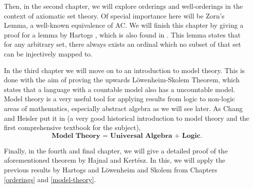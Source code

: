 \documentclass[../../main.tex]{subfiles}
\begin{document}
Then, in the second chapter, we will explore orderings and well-orderings in the context of axiomatic set theory.
Of special importance here will be Zorn's Lemma, a well-known equivalence of AC.
We will finish this chapter by giving a proof for a lemma by Hartogs \cite{Har15}, which is also found in \cite{Haj72}.
This lemma states that for any arbitrary set, there always exists an ordinal which no subset of that set can be injectively mapped to.

In the third chapter we will move on to an introduction to model theory. 
This is done with the aim of proving the upwards Löwenheim-Skolem Theorem, which states that a language with a countable model also has a uncountable model.
Model theory is a very useful tool for applying results from logic to non-logic areas of mathematics, especially abstract algebra as we will see later.
As Chang and Heisler put it in \cite{Cha90} (a very good historical introduction to model theory and the first comprehensive textbook for the subject), 
$$\textbf{Model Theory = Universal Algebra + Logic}.$$

Finally, in the fourth and final chapter, we will give a detailed proof of the aforementioned theorem by Hajnal and Kertész.
In this, we will apply the previous results by Hartogs and Löwenheim and Skolem from Chapters \ref{orderings} and \ref{model-theory}.
\end{document}
